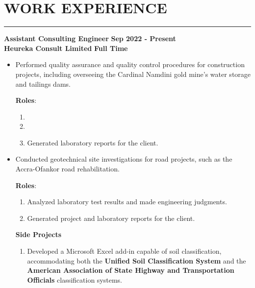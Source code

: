 \documentclass[letterpaper, 12pt]{article}
\newcommand{\cvsection}[1]{
	
	\section*{#1}	
	\rule[20pt]{\linewidth}{0.5pt} %

}
\newcommand{\verticalSpace}{4pt}
\newcommand{\itemizeMargin}{11pt}
\begin{document}
	
	\cvsection{WORK EXPERIENCE}
	
	\textbf{Assistant Consulting Engineer} \hfill \textbf{Sep 2022 - Present} \\ [\verticalSpace]
	\textbf{Heureka Consult Limited} \hfill \textbf{Full Time}
	
	\begin{itemize}[leftmargin=\itemizeMargin]
		
		\item Performed quality assurance and quality control procedures for construction projects, including overseeing the Cardinal Namdini gold mine's water storage and tailings dams.
		
		\textbf{Roles}:
		
		\begin{enumerate}[label=\roman*.,leftmargin=10pt]
			
			\item 
			\item
			\item Generated laboratory reports for the client.
			
		\end{enumerate}
		
		\item Conducted geotechnical site investigations for road projects, such as the Accra-Ofankor road rehabilitation.
		
		\textbf{Roles}:
		
		\begin{enumerate}[label=\roman*.,leftmargin=10pt]
			
			\item Analyzed laboratory test results and made engineering judgments.
			\item Generated project and laboratory reports for the client.
			
		\end{enumerate}
		
		\textbf{Side Projects}
		
		\begin{enumerate}[label=\roman*.,leftmargin=10pt]
			
			
			\item Developed a Microsoft Excel add-in capable of soil classification, accommodating both the \textbf{Unified Soil Classification System} and the \textbf{American Association of State Highway and Transportation Officials} classification systems.
			
		\end{enumerate}
		
	\end{itemize} 
	
\end{document}

